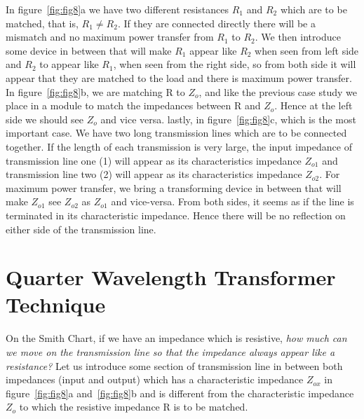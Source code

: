 In figure~\ref{fig:fig8}a we have two different resistances $R_1$ and $R_2$ which are to be matched, that is, $R_1\neq R_2$. If they are connected directly there will be a mismatch and no maximum power transfer from $R_1$ to $R_2$. We then introduce some device in between that will make $R_1$ appear like $R_2$ when seen from left side and $R_2$ to appear like $R_1$, when seen from the right side, so from both side it will appear that they are matched to the load and there is maximum power transfer. In figure~\ref{fig:fig8}b, we are matching R to $Z_o$, and like the previous case study we place in a module to match the impedances between R and $Z_o$. Hence at the left side we should see $Z_o$ and vice versa. lastly, in figure~\ref{fig:fig8}c, which is the most important case. We have two long transmission lines which are to be connected together. If the length of each transmission is very large, the input impedance of transmission line one (1) will appear as its characteristics impedance $ Z_{o1}$ and transmission line two (2) will appear as its characteristics impedance $ Z_{o2}$. For maximum power transfer, we bring a transforming device in between that will make $Z_{o1}$ see $Z_{o2}$ as $Z_{o1}$ and vice-versa. From both sides, it seems as if the line is terminated in its characteristic impedance. Hence there will be no reflection on either side of the transmission line.

\section{Quarter Wavelength Transformer Technique}
On the Smith Chart, if we have an impedance which is resistive, \emph{how much can we move on the transmission line so that the impedance always appear like a resistance?} Let us introduce some section of transmission line in between both impedances (input and output) which has a characteristic impedance $ Z_{ox}$ in figure~\ref{fig:fig8}a and~\ref{fig:fig8}b and is different from the characteristic impedance $ Z_o$ to which the resistive impedance R is to be matched.

